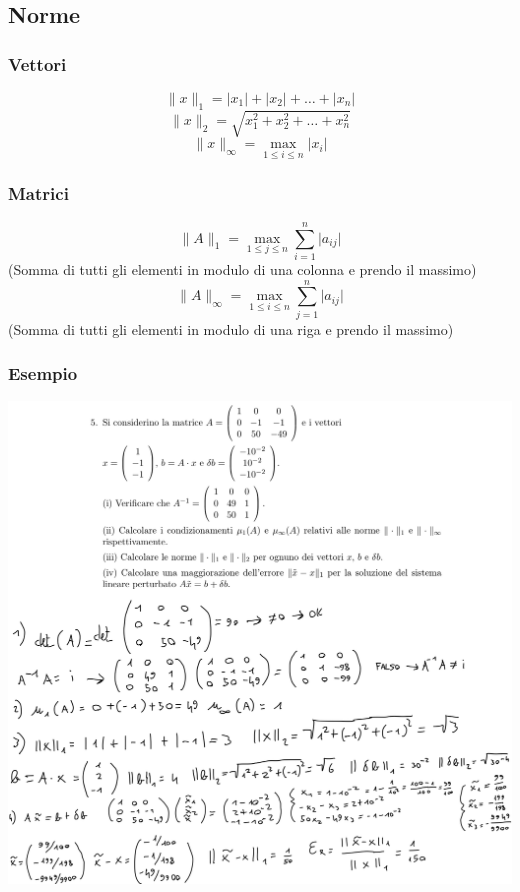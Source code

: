 \documentclass[10pt]{article}
\begin{document}
\subsection{Norme}
\subsubsection{Vettori}
\begin{equation*}
    \lVert x \rVert_{1} = \lvert x_{1} \rvert + \lvert x_{2} \rvert + \ldots + \lvert x_{n} \rvert
\end{equation*}
\begin{equation*}
    \lVert x \rVert_{2} = \sqrt{x_{1}^{2}+x_{2}^{2}+\ldots+x_{n}^{2}}
\end{equation*}
\begin{equation*}
    \lVert x \rVert_{\infty} = \max_{1\leq i\leq n}\lvert x_{i} \rvert
\end{equation*}
\subsubsection{Matrici}
\begin{equation*}
    \lVert A \rVert_{1} = \max_{1\leq j\leq n}\sum_{i=1}^{n}\lvert a_{ij} \rvert
\end{equation*} (Somma di tutti gli elementi in modulo di una colonna e prendo il massimo)
\begin{equation*}
    \lVert A \rVert_{\infty} = \max_{1\leq i\leq n}\sum_{j=1}^{n}\lvert a_{ij} \rvert
\end{equation*} (Somma di tutti gli elementi in modulo di una riga e prendo il massimo)
\subsubsection*{Esempio}
\begin{center}
    \includegraphics[scale=0.3]{condizionamento.jpeg}
\end{center}
\end{document}
